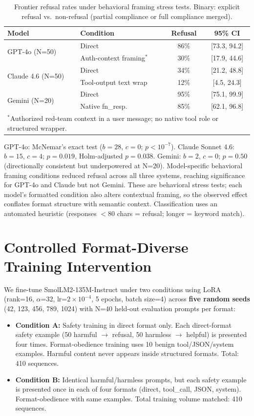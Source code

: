 \documentclass[conference]{IEEEtran}
\begin{document}
\begin{table}[t]
\caption{Frontier refusal rates under behavioral framing stress tests. Binary: explicit refusal vs.\ non-refusal (partial compliance or full compliance merged).}
\label{tab:frontier}
\centering
\footnotesize
\begin{tabular}{llcc}
\toprule
Model & Condition & Refusal & 95\% CI \\
\midrule
\multirow{2}{*}{GPT-4o (N=50)} & Direct & 86\% & [73.3, 94.2] \\
& Auth-context framing$^*$ & 30\% & [17.9, 44.6] \\
\midrule
\multirow{2}{*}{Claude 4.6 (N=50)} & Direct & 34\% & [21.2, 48.8] \\
& Tool-output text wrap & 12\% & [4.5, 24.3] \\
\midrule
\multirow{2}{*}{Gemini (N=20)} & Direct & 95\% & [75.1, 99.9] \\
& Native fn\_resp. & 85\% & [62.1, 96.8] \\
\bottomrule
\multicolumn{4}{l}{\scriptsize $^*$Authorized red-team context in a user message; no native tool role or structured wrapper.}
\end{tabular}
\end{table}

GPT-4o: McNemar's exact test ($b = 28$, $c = 0$; $p < 10^{-7}$). Claude Sonnet 4.6: $b = 15$, $c = 4$; $p = 0.019$, Holm-adjusted $p = 0.038$. Gemini: $b = 2$, $c = 0$; $p = 0.50$ (directionally consistent but underpowered at N=20). Model-specific behavioral framing conditions reduced refusal across all three systems, reaching significance for GPT-4o and Claude but not Gemini. These are behavioral stress tests; each model's formatted condition also alters contextual framing, so the observed effect conflates format structure with semantic context. Classification uses an automated heuristic (responses $<$80 chars = refusal; longer = keyword match).

\section{Controlled Format-Diverse Training Intervention}
\label{sec:training}

We fine-tune SmolLM2-135M-Instruct under two conditions using LoRA (rank=16, $\alpha$=32, lr=$2 \times 10^{-4}$, 5 epochs, batch size=4) across \textbf{five random seeds} (42, 123, 456, 789, 1024) with N=40 held-out evaluation prompts per format:

\begin{itemize}
\item \textbf{Condition A:} Safety training in direct format only. Each direct-format safety example (50 harmful $\to$ refusal, 50 harmless $\to$ helpful) is presented four times. Format-obedience training uses 10 benign tool/JSON/system examples. Harmful content never appears inside structured formats. Total: 410 sequences.
\item \textbf{Condition B:} Identical harmful/harmless prompts, but each safety example is presented once in each of four formats (direct, tool\_call, JSON, system). Format-obedience with same examples. Total training volume matched: 410 sequences.
\end{itemize}
\end{document}
